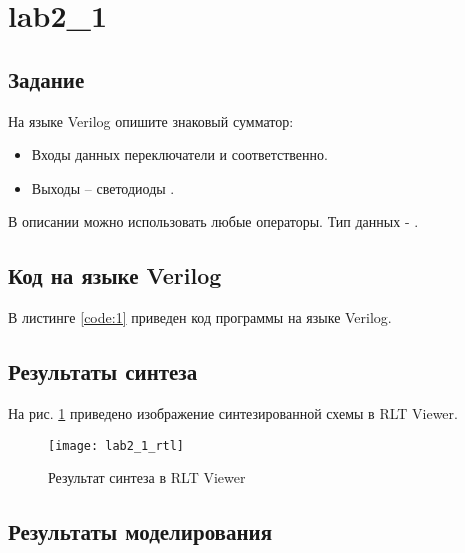 





\tableofcontents
\listoffigures
\lstlistoflistings
\newpage

\section{lab2\_1}

\subsection{Задание}

На языке Verilog опишите знаковый сумматор:
\begin{itemize}
	\item Входы данных переключатели  и  соответственно.
	\item Выходы – светодиоды .
\end{itemize}

В описании можно использовать любые операторы. Тип данных - .

\subsection{Код на языке Verilog}

В листинге \ref{code:1} приведен код программы на языке Verilog.



\subsection{Результаты синтеза}

На рис. \ref{fig:lab2_1_rtl} приведено изображение синтезированной схемы в RLT Viewer.

\begin{figure}[H]
\begin{center}
	\texttt{[image: lab2\_1\_rtl]}
	\caption{Результат синтеза в RLT Viewer}
	\label{fig:lab2_1_rtl}
\end{center}
\end{figure}

\subsection{Результаты моделирования}
\label{sec:lab2_1_modeling}

